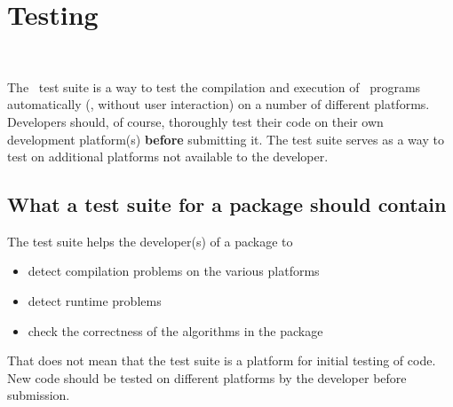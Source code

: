 
\chapter{Testing}
\label{chap:testing}
 \\



The \cgal\ test suite is a way to test the compilation and execution of \cgal\ 
programs automatically (\ie, without user interaction) on a number of 
different platforms.  Developers should, of course, thoroughly test their 
code on their own development platform(s) \textbf{before} submitting it.
The test suite serves as a way to test on additional platforms not available
to the developer.  

\section{What a test suite for a package should contain}
\label{sec:whats_in_test_suite}

The test suite helps the developer(s) of a package to 
\begin{itemize}
\item detect compilation problems on the various platforms
\item detect runtime problems
\item check the correctness of the algorithms in the package
\end{itemize}

That does not mean that the test suite is a platform for initial testing of 
code.  New code should be tested on different platforms by the developer
before submission.

